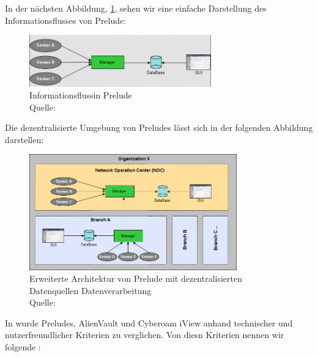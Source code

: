 \newpage
In der nächsten Abbildung, \ref{fig:Prelude}, sehen wir eine einfache Darstellung des Informationsflusses von Prelude:

\begin{figure}[H]
   \centering
   \includegraphics[width=0.7\textwidth]{assets/2_p4.png}
   \caption[Informationsfluss in Prelude]
   {Informationsflussin Prelude \\Quelle: \citep{Prelude_MU} }
   \label{fig:Prelude}
   \centering
\end{figure}

Die dezentralisierte Umgebung von Preludes lässt sich in der folgenden Abbildung darstellen:

\begin{figure}[H]
   \centering
   \includegraphics[width=0.8\textwidth]{assets/2_p5.png}
   \caption[Erweiterte Architektur von Prelude mit dezentralisierten Datenquellen und Datenverarbeitung]
   {Erweiterte Architektur von Prelude mit dezentralisierten Datenquellen Datenverarbeitung\\Quelle: \citep{Prelude_MU} }
   \centering
\end{figure}

\newpage
In \citep{Grammatikis_Prelude} wurde Preludes, AlienVault und Cyberoam iView anhand technischer und nutzerfreundlicher Kriterien zu verglichen. Von diesn Kriterien nennen wir folgende \citep{Grammatikis_Prelude}: 

